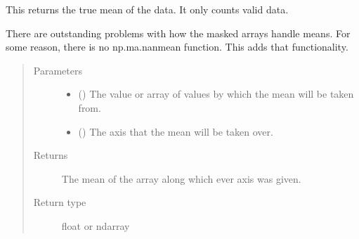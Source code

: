 \documentclass[letterpaper,10pt,english]{sphinxmanual}
\begin{document}
\begin{fulllineitems}
\label{\detokenize{python_docstrings/IfA_Smeargle.meta.mathematics:IfA_Smeargle.meta.mathematics.smeargle_mean}}
This returns the true mean of the data. It only counts valid data.

There are outstanding problems with how the masked arrays handle means.
For some reason, there is no np.ma.nanmean function. This adds that
functionality.
\begin{quote}\begin{description}
\item[{Parameters}] \leavevmode\begin{itemize}
\item {} 
 () \textendash{} The value or array of values by which the mean will be taken from.

\item {} 
 () \textendash{} The axis that the mean will be taken over.

\end{itemize}

\item[{Returns}] \leavevmode
{} \textendash{} The mean of the array along which ever axis was given.

\item[{Return type}] \leavevmode
float or ndarray

\end{description}\end{quote}

\end{fulllineitems}

\end{document}

